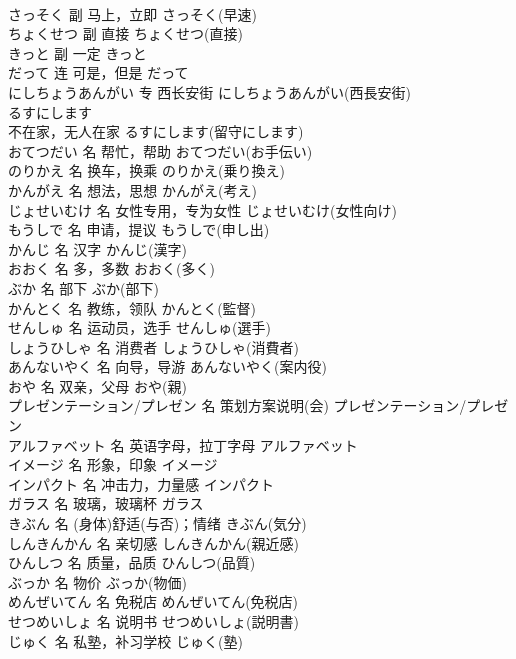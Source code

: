\documentclass[8pt]{extreport}
\begin{document}
\begin{CJK}{UTF8}{min}
\\	さっそく	副	马上，立即	さっそく(早速)	
\\	ちょくせつ	副	直接	ちょくせつ(直接)	
\\	きっと	副	一定	きっと	
\\	だって	连	可是，但是	だって	
\\	にしちょうあんがい	专	西长安街	にしちょうあんがい(西長安街)	
\\	るすにします	
\\	不在家，无人在家	るすにします(留守にします)	
\\	おてつだい	名	帮忙，帮助	おてつだい(お手伝い)	
\\	のりかえ	名	换车，换乘	のりかえ(乗り換え)	
\\	かんがえ	名	想法，思想	かんがえ(考え)	
\\	じょせいむけ	名	女性专用，专为女性	じょせいむけ(女性向け)	
\\	もうしで	名	申请，提议	もうしで(申し出)	
\\	かんじ	名	汉字	かんじ(漢字)	
\\	おおく	名	多，多数	おおく(多く)	
\\	ぶか	名	部下	ぶか(部下)	
\\	かんとく	名	教练，领队	かんとく(監督)	
\\	せんしゅ	名	运动员，选手	せんしゅ(選手)	
\\	しょうひしゃ	名	消费者	しょうひしゃ(消費者)	
\\	あんないやく	名	向导，导游	あんないやく(案内役)	
\\	おや	名	双亲，父母	おや(親)	
\\	プレゼンテーション/プレゼン	名	策划方案说明(会)	プレゼンテーション/プレゼン	
\\	アルファベット	名	英语字母，拉丁字母	アルファベット	
\\	イメージ	名	形象，印象	イメージ	
\\	インパクト	名	冲击力，力量感	インパクト	
\\	ガラス	名	玻璃，玻璃杯	ガラス	
\\	きぶん	名	(身体)舒适(与否)；情绪	きぶん(気分)	
\\	しんきんかん	名	亲切感	しんきんかん(親近感)	
\\	ひんしつ	名	质量，品质	ひんしつ(品質)	
\\	ぶっか	名	物价	ぶっか(物価)	
\\	めんぜいてん	名	免税店	めんぜいてん(免税店)	
\\	せつめいしょ	名	说明书	せつめいしょ(説明書)	
\\	じゅく	名	私塾，补习学校	じゅく(塾)	

\end{CJK}
\end{document}

